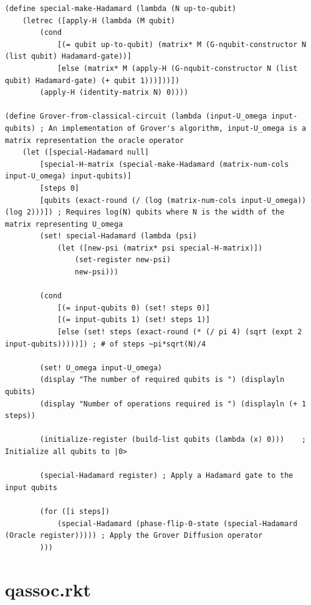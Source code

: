 \documentclass[11pt]{report}
\newcommand{\?}{\stackrel{?}{=}}
\begin{document}
\begin{appendix}
\begin{verbatim}
(define special-make-Hadamard (lambda (N up-to-qubit)
	(letrec ([apply-H (lambda (M qubit)
		(cond
			[(= qubit up-to-qubit) (matrix* M (G-nqubit-constructor N (list qubit) Hadamard-gate))]
			[else (matrix* M (apply-H (G-nqubit-constructor N (list qubit) Hadamard-gate) (+ qubit 1)))]))])
		(apply-H (identity-matrix N) 0))))

(define Grover-from-classical-circuit (lambda (input-U_omega input-qubits) ; An implementation of Grover's algorithm, input-U_omega is a matrix representation the oracle operator
	(let ([special-Hadamard null]
		[special-H-matrix (special-make-Hadamard (matrix-num-cols input-U_omega) input-qubits)] 
		[steps 0] 
		[qubits (exact-round (/ (log (matrix-num-cols input-U_omega)) (log 2)))]) ; Requires log(N) qubits where N is the width of the matrix representing U_omega
		(set! special-Hadamard (lambda (psi)
			(let ([new-psi (matrix* psi special-H-matrix)])
				(set-register new-psi)
				new-psi)))

		(cond
			[(= input-qubits 0) (set! steps 0)]
			[(= input-qubits 1) (set! steps 1)]
			[else (set! steps (exact-round (* (/ pi 4) (sqrt (expt 2 input-qubits)))))]) ; # of steps ~pi*sqrt(N)/4

		(set! U_omega input-U_omega)
		(display "The number of required qubits is ") (displayln qubits)
		(display "Number of operations required is ") (displayln (+ 1 steps))

		(initialize-register (build-list qubits (lambda (x) 0)))	; Initialize all qubits to |0>

		(special-Hadamard register)	; Apply a Hadamard gate to the input qubits

		(for ([i steps])
			(special-Hadamard (phase-flip-0-state (special-Hadamard (Oracle register))))) ; Apply the Grover Diffusion operator
		)))
	\end{verbatim}
	
	\chapter{qassoc.rkt}

	\inputminted[bgcolor=charcoal, linenos, breaklines]{scheme}{resources/code/qassoc.rkt}
	
\end{appendix}
\end{document}
